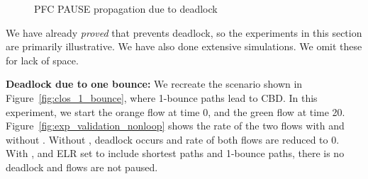 \begin{figure}[t]
	\centering
	

	
	\caption{PFC PAUSE propagation due to deadlock
	 }\label{fig:exp_validation_propagation}
	
\end{figure}


We have already {\em proved} that \sysname{} prevents deadlock, so the
experiments in this section are primarily illustrative. We have also done
extensive simulations. We omit these for lack of space.

\textbf{Deadlock due to one bounce:} We recreate the scenario shown in
Figure~\ref{fig:clos_1_bounce}, where 1-bounce paths lead to CBD.  In this
experiment, we start the orange flow at time 0, and the green flow at time 20.
Figure~\ref{fig:exp_validation_nonloop} shows the rate of the two flows with and
without \sysname{}.  Without \sysname{}, deadlock occurs and rate of both flows
are reduced to 0. With \sysname{}, and ELR set to include shortest paths and
1-bounce paths, there is no deadlock and flows are not paused.

